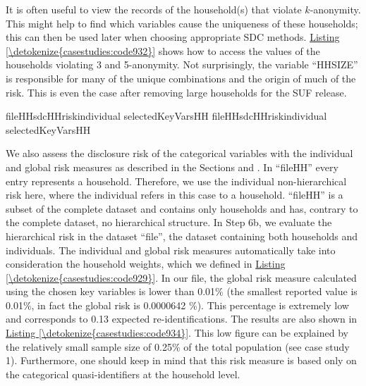 \documentclass[letterpaper,10pt,english]{sphinxmanual}
\begin{document}
It is often useful to view the records of the household(s) that violate
\(k\)-anonymity. This might help to find which variables cause the
uniqueness of these households; this can then be used later when
choosing appropriate SDC methods. \hyperref[\detokenize{casestudies:code932}]{Listing \ref{\detokenize{casestudies:code932}}} shows how to access the
values of the households violating 3 and 5-anonymity. Not surprisingly,
the variable “HHSIZE” is responsible for many of the unique combinations
and the origin of much of the risk. This is even the case after removing
large households for the SUF release.

\def\sphinxLiteralBlockLabel{\label{\detokenize{casestudies:code933}}}
%
\begin{sphinxVerbatim}[commandchars=\\\{\},numbers=left,firstnumber=1,stepnumber=1]
fileHH\PYG{p}{[}sdcHHriskindividual\PYG{p}{[}\PYG{p}{]}   selectedKeyVarsHH\PYG{p}{]} 
fileHH\PYG{p}{[}sdcHHriskindividual\PYG{p}{[}\PYG{p}{]}   selectedKeyVarsHH\PYG{p}{]} 
\end{sphinxVerbatim}

We also assess the disclosure risk of the categorical variables with the
individual and global risk measures as described in the Sections
and .
In “fileHH” every entry represents a household. Therefore, we use
the individual non-hierarchical risk here, where the individual refers
in this case to a household. “fileHH” is a subset of the complete
dataset and contains only households and has, contrary to the complete
dataset, no hierarchical structure. In Step 6b, we evaluate the
hierarchical risk in the dataset “file”, the dataset containing both
households and individuals. The individual and global risk measures
automatically take into consideration the household weights, which we
defined in \hyperref[\detokenize{casestudies:code929}]{Listing \ref{\detokenize{casestudies:code929}}}. In our file, the global risk measure calculated
using the chosen key variables is lower than 0.01\% (the smallest
reported value is 0.01\%, in fact the global risk is 0.0000642 \%). This
percentage is extremely low and corresponds to 0.13 expected
re-identifications. The results are also shown in \hyperref[\detokenize{casestudies:code934}]{Listing \ref{\detokenize{casestudies:code934}}}. This low
figure can be explained by the relatively small sample size of 0.25\% of
the total population (see case study 1). Furthermore, one should keep in
mind that this risk measure is based only on the categorical
quasi-identifiers at the household level.
\end{document}
